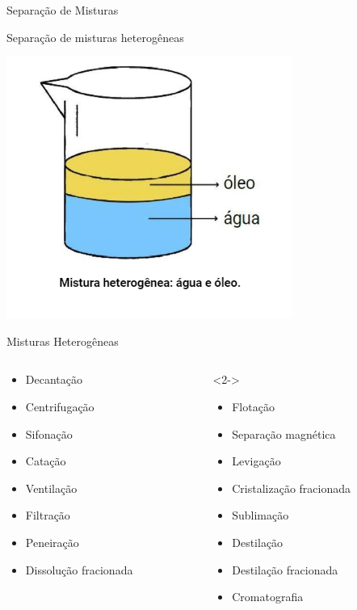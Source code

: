 \documentclass{beamer}
\begin{document}
\begin{frame}[label={sec:orgd9c8d62}]{Separação de Misturas}
\begin{block}{Separação de misturas heterogêneas}
\begin{center}
\includegraphics[scale=0.5]{../img/heterogenea.png}
\end{center}
\end{block}
\begin{block}{Misturas Heterogêneas}
\begin{columns}
\begin{column}{0.48\columnwidth}
\begin{block}{}
\begin{itemize}
\item Decantação
\item Centrifugação
\item Sifonação
\item Catação
\item Ventilação
\item Filtração
\item Peneiração
\item Dissolução fracionada
\end{itemize}
\end{block}
\end{column}
\begin{column}{0.48\columnwidth}
\begin{block}<2->{}
\begin{itemize}
\item Flotação
\item Separação magnética
\item Levigação
\item Cristalização fracionada
\item Sublimação
\item Destilação
\item Destilação fracionada
\item Cromatografia
\end{itemize}
\end{block}
\end{column}
\end{columns}
\end{block}
\end{frame}
\end{document}
